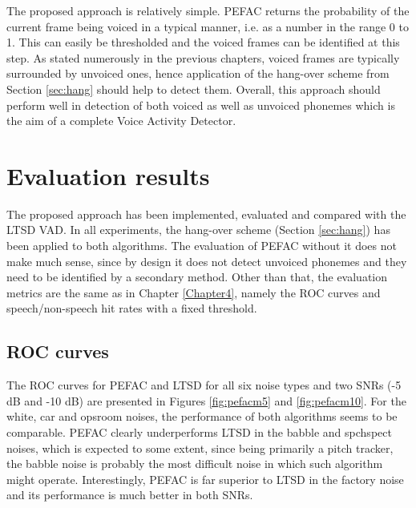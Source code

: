 The proposed approach is relatively simple. PEFAC returns the probability of the current frame being voiced in a typical manner, i.e. as a number in the range 0 to 1. This can easily be thresholded and the voiced frames can be identified at this step. As stated numerously in the previous chapters, voiced frames are typically surrounded by unvoiced ones, hence application of the hang-over scheme from Section \ref{sec:hang} should help to detect them. Overall, this approach should perform well in detection of both voiced as well as unvoiced phonemes which is the aim of a complete Voice Activity Detector.


\section{Evaluation results}

The proposed approach has been implemented, evaluated and compared with the LTSD VAD. In all experiments, the hang-over scheme (Section \ref{sec:hang}) has been applied to both algorithms. The evaluation of PEFAC without it does not make much sense, since by design it does not detect unvoiced phonemes and they need to be identified by a secondary method. Other than that, the evaluation metrics are the same as in Chapter \ref{Chapter4}, namely the ROC curves and speech/non-speech hit rates with a fixed threshold.


\subsection{ROC curves}

The ROC curves for PEFAC and LTSD for all six noise types and two SNRs (-5 dB and -10 dB) are presented in Figures \ref{fig:pefacm5} and \ref{fig:pefacm10}. For the white, car and opsroom noises, the performance of both algorithms seems to be comparable. PEFAC clearly underperforms LTSD in the babble and spchspect noises, which is expected to some extent, since being primarily a pitch tracker, the babble noise is probably the most difficult noise in which such algorithm might operate. Interestingly, PEFAC is far superior to LTSD in the factory noise and its performance is much better in both SNRs.

